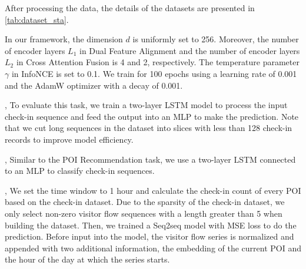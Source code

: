 After processing the data, the details of the datasets are presented in \tableautorefname\ref{tab:dataset_sta}.
\begin{table}[t]
\centering
     \caption{Statistics of Datasets.} 
    \label{tab:dataset_sta}
\end{table}

In our framework, the dimension $d$ is uniformly set to 256.  Moreover, the number of encoder layers $L_1$ in Dual Feature Alignment and the number of encoder layers $L_2$ in Cross Attention Fusion is 4 and 2, respectively. The temperature parameter $\gamma$ in InfoNCE is set to 0.1. We train \name for 100 epochs using a learning rate of 0.001 and the AdamW optimizer with a decay of 0.001. 

,
To evaluate this task, we train a two-layer LSTM model to process the input check-in sequence and feed the output into an MLP to make the prediction. Note that we cut long sequences in the dataset into slices with less than 128 check-in records to improve model efficiency.

,
Similar to the POI Recommendation task, we use a two-layer LSTM connected to an MLP to classify check-in sequences.


,
 We set the time window to 1 hour and calculate the check-in count of every POI based on the check-in dataset. Due to the sparsity of the check-in dataset, we only select non-zero visitor flow sequences with a length greater than 5 when building the dataset. Then, we trained a Seq2seq model with MSE loss to do the prediction. Before input into the model, the visitor flow series is normalized and appended with two additional information, the embedding of the current POI and the hour of the day at which the series starts.


